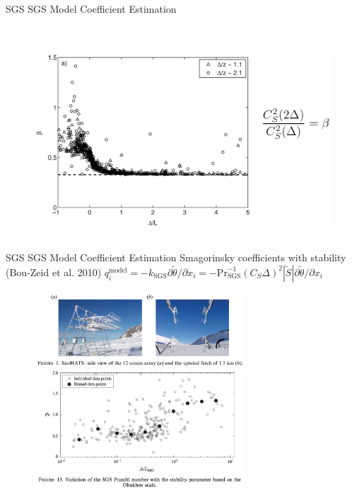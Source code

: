 \begin{frame}{SGS SGS Model Coefficient Estimation}
\begin{columns}
\begin{column}{.6\textwidth}
\begin{figure}
      ~\\\includegraphics[width=1\textwidth]{apriori17}
      \end{figure}
    \end{column}
  \end{columns}
\end{frame}

\begin{frame}{SGS SGS Model Coefficient Estimation}
Smagorinsky coefficients with stability (Bou-Zeid et al. 2010)
$q_i^{\text{model}} = -k_{\text{SGS}}\partial \tilde{\theta}/\partial x_i = -\text{Pr}^{-1}_{\text{SGS}}(C_S \Delta)^2|\tilde{S}|\partial \tilde{\theta}/\partial x_i$
	\begin{figure}
		\includegraphics[width=0.7\textwidth]{apriori18}\\
		\includegraphics[width=0.7\textwidth]{apriori19}
	\end{figure}
\end{frame}

